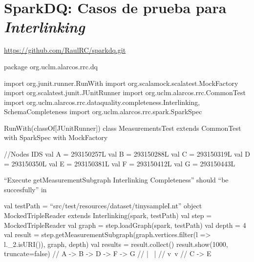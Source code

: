 \chapter{SparkDQ: Casos de prueba para \textit{Interlinking}}
\label{chap:sparkrdf.test.inter}

\url{https://github.com/RaulRC/sparkdq.git}


\begin{listing}[
  language = scala,
  numbers=left,
  numberstyle=\tiny,
  stepnumber=5,
  numbersep=5pt,
  frame=single,
  caption  = {SparkDQ: Fragmento de tests unitarios para Interlinking},
  label    = code:sparkdq.test.inter]
package org.uclm.alarcos.rrc.dq

import org.junit.runner.RunWith
import org.scalamock.scalatest.MockFactory
import org.scalatest.junit.JUnitRunner
import org.uclm.alarcos.rrc.CommonTest
import org.uclm.alarcos.rrc.dataquality.completeness.{Interlinking,
  SchemaCompleteness}
import org.uclm.alarcos.rrc.spark.SparkSpec

RunWith(classOf[JUnitRunner])
class MeasurementsTest extends CommonTest with SparkSpec with MockFactory {
  //Nodes IDS
  val A = 293150257L
  val B = 293150288L
  val C = 293150319L
  val D = 293150350L
  val E = 293150381L
  val F = 293150412L
  val G = 293150443L

  ``Execute getMeasurementSubgraph Interlinking Completeness'' should ``be
  succesfully'' in {
    val testPath = ``src/test/resources/dataset/tinysampleI.nt''
    object MockedTripleReader extends Interlinking(spark, testPath)
    val step = MockedTripleReader
    val graph = step.loadGraph(spark, testPath)
    val depth = 4
    val result = step.getMeasurementSubgraph(graph.vertices.filter(l =>
    l._2.isURI()), graph, depth)
    val results = result.collect()
    result.show(1000, truncate=false)
    //    A -> B -> D -> F -> G
    //         | \  |
    //         v  \,v
    //         C -> E

}}
\end{listing}

